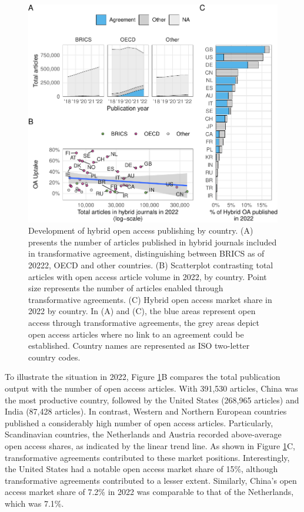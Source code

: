 \documentclass[a4paper,man,floatsintext,longtable,noextraspace,12pt]{apa6}
\begin{document}
\begin{figure}[ht!]

{\centering \includegraphics[width=0.99\linewidth,]{fig/country_patch-1} 

}

\caption{Development of hybrid open access publishing by country. (A) presents the number of articles published in hybrid journals included in transformative agreement, distinguishing between BRICS as of 20222, OECD and other countries. (B) Scatterplot contrasting total articles with open access article volume in 2022, by country. Point size represents the number of articles enabled through transformative agreements. (C) Hybrid open access market share in 2022 by country. In (A) and (C), the blue areas represent open access through transformative agreements, the grey areas depict open access articles where no link to an agreement could be established. Country names are represented as ISO two-letter country codes.}\label{fig:country_patch}
\end{figure}

To illustrate the situation in 2022, Figure \ref{fig:country_patch}B
compares the total publication output with the number of open access
articles. With 391,530 articles, China was the most productive country,
followed by the United States (268,965 articles) and India (87,428
articles). In contrast, Western and Northern European countries
published a considerably high number of open access articles.
Particularly, Scandinavian countries, the Netherlands and Austria
recorded above-average open access shares, as indicated by the linear
trend line. As shown in Figure \ref{fig:country_patch}C, transformative
agreements contributed to these market positions. Interestingly, the
United States had a notable open access market share of 15\%, although
transformative agreements contributed to a lesser extent. Similarly,
China's open access market share of 7.2\% in 2022 was comparable to that
of the Netherlands, which was 7.1\%.
\end{document}
